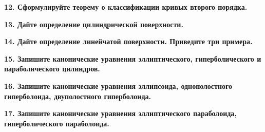 \documentclass[11pt,a4paper]{article}
\begin{document}
\textbf{12. Сформулируйте теорему о классификации кривых второго порядка.\\}

\textbf{13. Дайте определение цилиндрической поверхности.\\}

\textbf{14. Дайте определение линейчатой поверхности. Приведите три примера.\\}

\textbf{15. Запишите канонические уравнения эллиптического, гиперболического и параболического цилиндров.\\}

\textbf{16. Запишите канонические уравнения эллипсоида, однополостного гиперболоида, двуполостного гиперболоида.\\}

\textbf{17. Запишите канонические уравнения эллиптического параболоида, гиперболического параболоида.\\}
\end{document}
